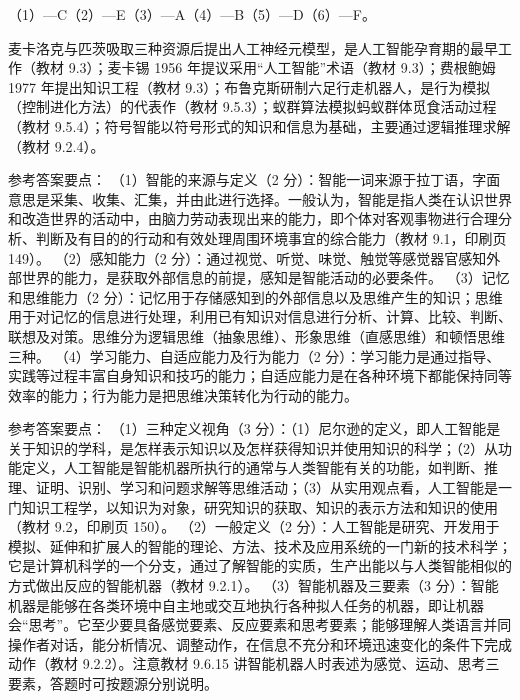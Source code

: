 \documentclass[a4paper,11pt]{article}
\begin{document}

\q （1）—C\quad （2）—E\quad （3）—A\quad （4）—B\quad （5）—D\quad （6）—F。
\begin{analysis}麦卡洛克与匹茨吸取三种资源后提出人工神经元模型，是人工智能孕育期的最早工作（教材 9.3）；麦卡锡 1956 年提议采用“人工智能”术语（教材 9.3）；费根鲍姆 1977 年提出知识工程（教材 9.3）；布鲁克斯研制六足行走机器人，是行为模拟（控制进化方法）的代表作（教材 9.5.3）；蚁群算法模拟蚂蚁群体觅食活动过程（教材 9.5.4）；符号智能以符号形式的知识和信息为基础，主要通过逻辑推理求解（教材 9.2.4）。\end{analysis}


\q 参考答案要点：
（1）智能的来源与定义（2 分）：智能一词来源于拉丁语，字面意思是采集、收集、汇集，并由此进行选择。一般认为，智能是指人类在认识世界和改造世界的活动中，由脑力劳动表现出来的能力，即个体对客观事物进行合理分析、判断及有目的的行动和有效处理周围环境事宜的综合能力（教材 9.1，印刷页 149）。
（2）感知能力（2 分）：通过视觉、听觉、味觉、触觉等感觉器官感知外部世界的能力，是获取外部信息的前提，感知是智能活动的必要条件。
（3）记忆和思维能力（2 分）：记忆用于存储感知到的外部信息以及思维产生的知识；思维用于对记忆的信息进行处理，利用已有知识对信息进行分析、计算、比较、判断、联想及对策。思维分为逻辑思维（抽象思维）、形象思维（直感思维）和顿悟思维三种。
（4）学习能力、自适应能力及行为能力（2 分）：学习能力是通过指导、实践等过程丰富自身知识和技巧的能力；自适应能力是在各种环境下都能保持同等效率的能力；行为能力是把思维决策转化为行动的能力。

\q 参考答案要点：
（1）三种定义视角（3 分）：（1）尼尔逊的定义，即人工智能是关于知识的学科，是怎样表示知识以及怎样获得知识并使用知识的科学；（2）从功能定义，人工智能是智能机器所执行的通常与人类智能有关的功能，如判断、推理、证明、识别、学习和问题求解等思维活动；（3）从实用观点看，人工智能是一门知识工程学，以知识为对象，研究知识的获取、知识的表示方法和知识的使用（教材 9.2，印刷页 150）。
（2）一般定义（2 分）：人工智能是研究、开发用于模拟、延伸和扩展人的智能的理论、方法、技术及应用系统的一门新的技术科学；它是计算机科学的一个分支，通过了解智能的实质，生产出能以与人类智能相似的方式做出反应的智能机器（教材 9.2.1）。
（3）智能机器及三要素（3 分）：智能机器是能够在各类环境中自主地或交互地执行各种拟人任务的机器，即让机器会“思考”。它至少要具备感觉要素、反应要素和思考要素；能够理解人类语言并同操作者对话，能分析情况、调整动作，在信息不充分和环境迅速变化的条件下完成动作（教材 9.2.2）。注意教材 9.6.15 讲智能机器人时表述为感觉、运动、思考三要素，答题时可按题源分别说明。
\end{document}
